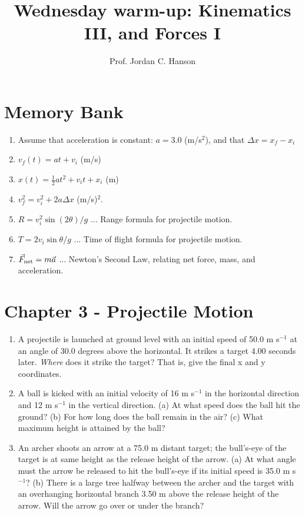 \documentclass{article}
\begin{document}
\twocolumn

\title{Wednesday warm-up: Kinematics III, and Forces I}
\author{Prof. Jordan C. Hanson}

\maketitle

\section{Memory Bank}

\begin{enumerate}
\item Assume that acceleration is constant: $a = 3.0$ (m/s$^2$), and that $\Delta x = x_f - x_i$
\item $v_f(t) = at + v_{i}$ (m/s)
\item $x(t) = \frac{1}{2}at^2 + v_{i} t + x_{i}$ (m)
\item $v_f^2 = v_i^2 + 2a\Delta x$ (m/s)$^2$.
\item $R = v_i^2 \sin(2\theta)/g$ ... Range formula for projectile motion.
\item $T = 2v_i\sin\theta/g$ ... Time of flight formula for projectile motion.
\item $\vec{F}_{\rm net} = m \vec{a}$ ... Newton's Second Law, relating net force, mass, and acceleration.
\end{enumerate}

\section{Chapter 3 - Projectile Motion}

\begin{enumerate}
\item A projectile is launched at ground level with an initial speed of 50.0 m s$^{-1}$ at an angle of 30.0 degrees above the horizontal. It strikes a target 4.00 seconds later.  \textit{Where} does it strike the target?  That is, give the final x and y coordinates. \\ \vspace{3cm}
\item A ball is kicked with an initial velocity of 16 m s$^{-1}$ in the horizontal direction and 12 m s$^{-1}$ in the vertical direction. (a) At what speed does the ball hit the ground? (b) For how long does the ball remain in the air? (c) What maximum height is attained by the ball? \\ \vspace{3cm}
\item An archer shoots an arrow at a 75.0 m distant target; the bull's-eye of the target is at same height as the release height of the arrow. (a) At what angle must the arrow be released to hit the bull’s-eye if its initial speed is 35.0 m s$^{-1}$? (b) There is a large tree halfway between the archer and the target with an overhanging horizontal branch 3.50 m above the release height of the arrow. Will the arrow go over or under the branch? \\ \vspace{3cm}
\end{enumerate}
\end{document}
